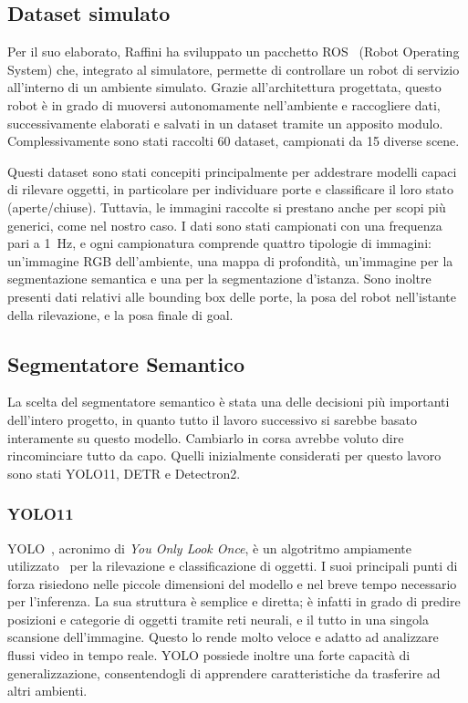 \documentclass[12pt]{report}
\begin{document}
\subsection{Dataset simulato}
\label{chap:dataset_simulato}

Per il suo elaborato, Raffini ha sviluppato un pacchetto ROS~\cite{quigley2009ros} (Robot Operating System) che, integrato al simulatore, permette di controllare un robot di servizio all'interno di un ambiente simulato. Grazie all'architettura progettata, questo robot è in grado di muoversi autonomamente nell'ambiente e raccogliere dati, successivamente elaborati e salvati in un dataset tramite un apposito modulo. Complessivamente sono stati raccolti 60 dataset, campionati da 15 diverse scene.

Questi dataset sono stati concepiti principalmente per addestrare modelli capaci di rilevare oggetti, in particolare per individuare porte e classificare il loro stato (aperte/chiuse). Tuttavia, le immagini raccolte si prestano anche per scopi più generici, come nel nostro caso. I dati sono stati campionati con una frequenza pari a \SI{1}{\hertz}, e ogni campionatura comprende quattro tipologie di immagini: un'immagine RGB dell'ambiente, una mappa di profondità, un'immagine per la segmentazione semantica e una per la segmentazione d'istanza. Sono inoltre presenti dati relativi alle bounding box delle porte, la posa del robot nell'istante della rilevazione, e la posa finale di goal.

\subsection{Segmentatore Semantico}
\label{chap:segmentatore_semantico}

La scelta del segmentatore semantico è stata una delle decisioni più importanti dell'intero progetto, in quanto tutto il lavoro successivo si sarebbe basato interamente su questo modello. Cambiarlo in corsa avrebbe voluto dire rincominciare tutto da capo. Quelli inizialmente considerati per questo lavoro sono stati YOLO11, DETR e Detectron2.

\subsubsection{YOLO11}

YOLO~\cite{JIANG20221066}, acronimo di \textit{You Only Look Once}, è un algotritmo ampiamente utilizzato~\cite{sultana2020review} per la rilevazione e classificazione di oggetti. I suoi principali punti di forza risiedono nelle piccole dimensioni del modello e nel breve tempo necessario per l'inferenza. La sua struttura è semplice e diretta; è infatti in grado di predire posizioni e categorie di oggetti tramite reti neurali, e il tutto in una singola scansione dell'immagine. Questo lo rende molto veloce e adatto ad analizzare flussi video in tempo reale. YOLO possiede inoltre una forte capacità di generalizzazione, consentendogli di apprendere caratteristiche da trasferire ad altri ambienti.
\end{document}
